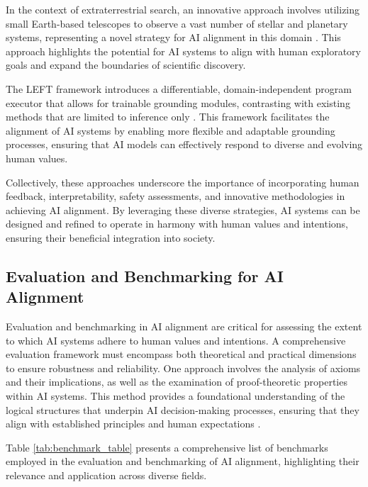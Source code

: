 In the context of extraterrestrial search, an innovative approach involves utilizing small Earth-based telescopes to observe a vast number of stellar and planetary systems, representing a novel strategy for AI alignment in this domain \cite{lubin2016searchdirectedintelligence}. This approach highlights the potential for AI systems to align with human exploratory goals and expand the boundaries of scientific discovery.



The LEFT framework introduces a differentiable, domain-independent program executor that allows for trainable grounding modules, contrasting with existing methods that are limited to inference only \cite{hsu2023whatsleftconceptgrounding}. This framework facilitates the alignment of AI systems by enabling more flexible and adaptable grounding processes, ensuring that AI models can effectively respond to diverse and evolving human values.



Collectively, these approaches underscore the importance of incorporating human feedback, interpretability, safety assessments, and innovative methodologies in achieving AI alignment. By leveraging these diverse strategies, AI systems can be designed and refined to operate in harmony with human values and intentions, ensuring their beneficial integration into society.




\subsection{Evaluation and Benchmarking for AI Alignment} \label{subsec:Evaluation and Benchmarking for AI Alignment}



Evaluation and benchmarking in AI alignment are critical for assessing the extent to which AI systems adhere to human values and intentions. A comprehensive evaluation framework must encompass both theoretical and practical dimensions to ensure robustness and reliability. One approach involves the analysis of axioms and their implications, as well as the examination of proof-theoretic properties within AI systems. This method provides a foundational understanding of the logical structures that underpin AI decision-making processes, ensuring that they align with established principles and human expectations \cite{cieslinski2022axiomstypefreesubjectiveprobability}.

Table \ref{tab:benchmark_table} presents a comprehensive list of benchmarks employed in the evaluation and benchmarking of AI alignment, highlighting their relevance and application across diverse fields.

